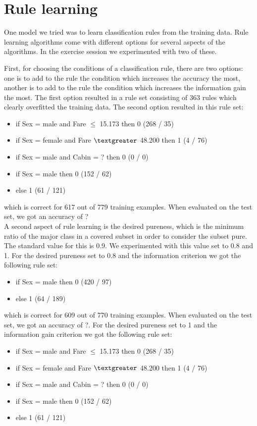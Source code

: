 \documentclass[12pt,a4paper]{article}
\begin{document}
\section{Rule learning}
One model we tried was to learn classification rules from the training data. Rule learning algorithms come with different options for several aspects of the algorithms. In the exercise session we experimented with two of these.
\par First, for choosing the conditions of a classification rule, there are two options: one is to add to the rule the condition which increases the accuracy the most, another is to add to the rule the condition which increases the information gain the most. The first option resulted in a rule set consisting of 363 rules which clearly overfitted the training data.
The second option resulted in this rule set:
\begin{itemize}

\item if Sex = male and Fare $\leq$ 15.173 then 0  (268 / 35)
\item if Sex = female and Fare $\textgreater$ 48.200 then 1  (4 / 76)
\item if Sex = male and Cabin = ? then 0  (0 / 0)
\item if Sex = male then 0  (152 / 62)
\item else 1  (61 / 121)

\end{itemize}
which is correct for 617 out of 779 training examples.
When evaluated on the test set, we got an accuracy of ?\\
A second aspect of rule learning is the desired pureness, which is the minimum ratio of the major class in a covered subset in order to consider the subset pure. The standard value for this is 0.9. We experimented with this value set to 0.8 and 1.
For the desired pureness set to 0.8 and the information criterion we got the following rule set:
\begin{itemize}

\item if Sex = male then 0  (420 / 97)
\item else 1  (64 / 189)

\end{itemize}
which is correct for 609 out of 770 training examples.
When evaluated on the test set, we got an accuracy of ?.
For the desired pureness set to 1 and the information gain criterion we got the following rule set:
\begin{itemize}

\item if Sex = male and Fare $\leq$ 15.173 then 0  (268 / 35)
\item if Sex = female and Fare $\textgreater$ 48.200 then 1  (4 / 76)
\item if Sex = male and Cabin = ? then 0  (0 / 0)
\item if Sex = male then 0  (152 / 62)
\item else 1  (61 / 121)

\end{itemize}
\end{document}
